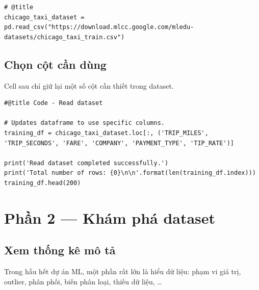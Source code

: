 \documentclass[12pt,a4paper]{article}
\begin{document}
\begin{lstlisting}
# @title
chicago_taxi_dataset = pd.read_csv("https://download.mlcc.google.com/mledu-datasets/chicago_taxi_train.csv")
\end{lstlisting}

\subsection{Chọn cột cần dùng}

\begin{phuongphap}[title={Giữ lại một số cột}]
Cell sau chỉ giữ lại một số cột cần thiết trong dataset.
\end{phuongphap}

\begin{lstlisting}
#@title Code - Read dataset

# Updates dataframe to use specific columns.
training_df = chicago_taxi_dataset.loc[:, ('TRIP_MILES', 'TRIP_SECONDS', 'FARE', 'COMPANY', 'PAYMENT_TYPE', 'TIP_RATE')]

print('Read dataset completed successfully.')
print('Total number of rows: {0}\n\n'.format(len(training_df.index)))
training_df.head(200)
\end{lstlisting}

\newpage

\section{Phần 2 --- Khám phá dataset}

\subsection{Xem thống kê mô tả}

\begin{dongco}[title={Vì sao phải ``hiểu dữ liệu'' trước?}]
Trong hầu hết dự án ML, một phần rất lớn là hiểu dữ liệu:
phạm vi giá trị, outlier, phân phối, biến phân loại, thiếu dữ liệu, \ldots
\end{dongco}
\end{document}
